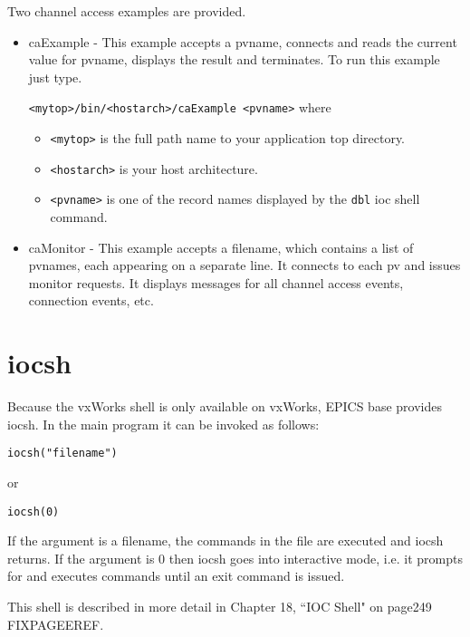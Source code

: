 Two channel access examples are provided.

\begin{itemize}\item caExample - This example accepts a pvname, connects and reads the current value for pvname, displays the result 
and terminates. To run this example just type.

\verb|<mytop>/bin/<hostarch>/caExample <pvname>|  where

\begin{itemize}

\item \verb|<mytop>| is the full path name to your application top directory.

\item \verb|<hostarch>| is your host architecture.

\item \verb|<pvname>| is one of the record names displayed by the \verb|dbl| ioc shell command.

\end{itemize}

\item caMonitor - This example accepts a filename, which contains a list of pvnames, each appearing on a separate line. 
It connects to each pv and issues monitor requests. It displays messages for all channel access events, connection 
events, etc.

\end{itemize}\section{iocsh}

Because the vxWorks shell is only available on vxWorks, EPICS base provides iocsh. In the main program it can be 
invoked as follows:

\begin{verbatim}iocsh("filename")
\end{verbatim}or

\begin{verbatim}iocsh(0)
\end{verbatim}If the argument is a filename, the commands in the file are executed and iocsh returns. If the argument is 0 then iocsh goes 
into interactive mode, i.e. it prompts for and executes commands until an exit command is issued.

This shell is described in more detail in Chapter 18, ``IOC Shell" on page249 FIXPAGEEREF.

